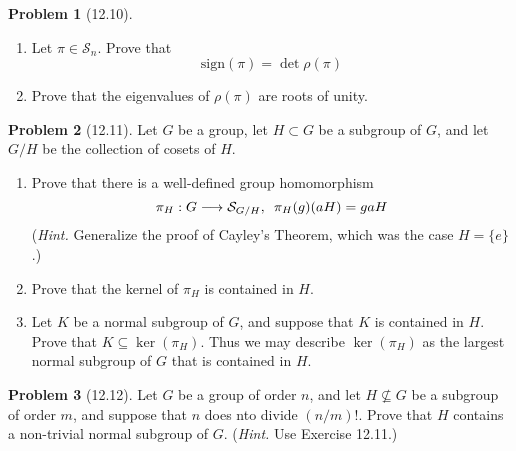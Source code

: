 \documentclass[12pt]{article}
\theoremstyle{definition}
\newtheorem{problem}{Problem}
\begin{document}
\begin{problem}[12.10]
\begin{enumerate}[label=(\alph*)]
        \item Let $\pi \in \mathcal{S}_n$. Prove that
              \[
                \text{sign}(\pi) = \det{\rho(\pi)}
              \]
        \begin{solution}

        \end{solution}

        \item Prove that the eigenvalues of $\rho(\pi)$ are roots of unity.
        \begin{solution}

        \end{solution}
    \end{enumerate}
\end{problem}

\begin{problem}[12.11]
    Let $G$ be a group, let $H \subset G$ be a subgroup of $G$, and let $G/H$ be the collection of cosets of $H$.
    \begin{enumerate}[label=(\alph*)]
        \item Prove that there is a well-defined group homomorphism
        \[
            \pi_H : G \longrightarrow \mathcal{S}_{G/H}, \hspace{5px} \pi_H(g)(a H) = gaH
        \]
        (\textit{Hint.} Generalize the proof of Cayley's Theorem, which was the case $H = \{e\}$.)
        \begin{solution}

        \end{solution}

        \item Prove that the kernel of $\pi_H$ is contained in $H$.
        \begin{solution}

        \end{solution}

        \item Let $K$ be a normal subgroup of $G$, and suppose that $K$ is contained in $H$. 
              Prove that $K \subseteq \ker(\pi_H)$. Thus we may describe $\ker(\pi_H)$ as the
              largest normal subgroup of $G$ that is contained in $H$.
        \begin{solution}

        \end{solution}
    \end{enumerate}
\end{problem}

\begin{problem}[12.12]
    Let $G$ be a group of order $n$, and let $H \not\subseteq G$ be a subgroup of order $m$, and suppose
    that $n$ does nto divide $(n/m)!$. Prove that $H$ contains a non-trivial normal subgroup of $G$. 
    (\textit{Hint.} Use Exercise 12.11.)
    \begin{solution}

    \end{solution}
\end{problem}
\end{document}

